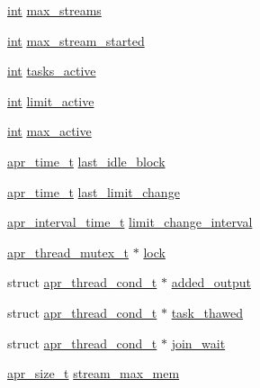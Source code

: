 \begin{DoxyCompactItemize}
\item 
\hyperlink{pcre_8txt_a42dfa4ff673c82d8efe7144098fbc198}{int} \hyperlink{structh2__mplx_a3e9f0fd33b0cb44fe3b4ca711c6ca2a3}{max\+\_\+streams}
\item 
\hyperlink{pcre_8txt_a42dfa4ff673c82d8efe7144098fbc198}{int} \hyperlink{structh2__mplx_a8ca4248d31d38a65be9c4d78b53d1c5c}{max\+\_\+stream\+\_\+started}
\item 
\hyperlink{pcre_8txt_a42dfa4ff673c82d8efe7144098fbc198}{int} \hyperlink{structh2__mplx_a8d141fea6adae0c6fc8dcf262fd39803}{tasks\+\_\+active}
\item 
\hyperlink{pcre_8txt_a42dfa4ff673c82d8efe7144098fbc198}{int} \hyperlink{structh2__mplx_a2039d8d01c7c604fa3f29ded882763e3}{limit\+\_\+active}
\item 
\hyperlink{pcre_8txt_a42dfa4ff673c82d8efe7144098fbc198}{int} \hyperlink{structh2__mplx_a9a65d22a182d79545427243afc7e4814}{max\+\_\+active}
\item 
\hyperlink{group__apr__time_gadb4bde16055748190eae190c55aa02bb}{apr\+\_\+time\+\_\+t} \hyperlink{structh2__mplx_ac8a88f82563b2e86182ce73cb4af9464}{last\+\_\+idle\+\_\+block}
\item 
\hyperlink{group__apr__time_gadb4bde16055748190eae190c55aa02bb}{apr\+\_\+time\+\_\+t} \hyperlink{structh2__mplx_a8c5573ba81170d83bab259abc5342cdf}{last\+\_\+limit\+\_\+change}
\item 
\hyperlink{group__apr__time_gaae2129185a395cc393f76fabf4f43e47}{apr\+\_\+interval\+\_\+time\+\_\+t} \hyperlink{structh2__mplx_a39a9d7f3ca84f97a0b0f7fa8b0fd37f7}{limit\+\_\+change\+\_\+interval}
\item 
\hyperlink{structapr__thread__mutex__t}{apr\+\_\+thread\+\_\+mutex\+\_\+t} $\ast$ \hyperlink{structh2__mplx_a1546d911db4f2865cac8843812207dfb}{lock}
\item 
struct \hyperlink{structapr__thread__cond__t}{apr\+\_\+thread\+\_\+cond\+\_\+t} $\ast$ \hyperlink{structh2__mplx_a8b38de7d091e8ce87dc76af576212fb4}{added\+\_\+output}
\item 
struct \hyperlink{structapr__thread__cond__t}{apr\+\_\+thread\+\_\+cond\+\_\+t} $\ast$ \hyperlink{structh2__mplx_adc48b71917bc52918f064f8c3e10ab00}{task\+\_\+thawed}
\item 
struct \hyperlink{structapr__thread__cond__t}{apr\+\_\+thread\+\_\+cond\+\_\+t} $\ast$ \hyperlink{structh2__mplx_a73aa7f159ac689bf606b7cea6364a2de}{join\+\_\+wait}
\item 
\hyperlink{group__apr__platform_gaaa72b2253f6f3032cefea5712a27540e}{apr\+\_\+size\+\_\+t} \hyperlink{structh2__mplx_a74f412262a99a27e77aa6a20819657da}{stream\+\_\+max\+\_\+mem}

\end{DoxyCompactItemize}
